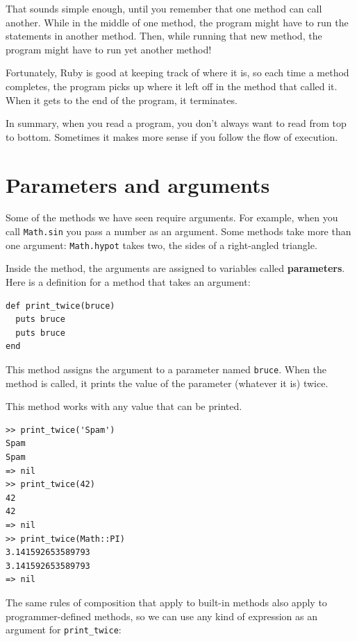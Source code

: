 \documentclass[10pt]{book}
\begin{document}
That sounds simple enough, until you remember that one method can
call another.  While in the middle of one method, the program might
have to run the statements in another method.  Then, while
running that new method, the program might have to run yet
another method!

Fortunately, Ruby is good at keeping track of where it is, so each
time a method completes, the program picks up where it left off in
the method that called it.  When it gets to the end of the program,
it terminates.

In summary, when you read a program, you
don't always want to read from top to bottom.  Sometimes it makes
more sense if you follow the flow of execution.


\section{Parameters and arguments}
\label{parameters}

Some of the methods we have seen require arguments.  For
example, when you call {\tt Math.sin} you pass a number
as an argument.  Some methods take more than one argument:
{\tt Math.hypot} takes two, the sides of a right-angled triangle.

Inside the method, the arguments are assigned to
variables called {\bf parameters}.  Here is a definition for
a method that takes an argument:

\begin{verbatim}
def print_twice(bruce)
  puts bruce
  puts bruce
end
\end{verbatim}
%
This method assigns the argument to a parameter
named {\tt bruce}.  When the method is called, it prints the value of
the parameter (whatever it is) twice.

This method works with any value that can be printed.

\begin{verbatim}
>> print_twice('Spam')
Spam
Spam
=> nil
>> print_twice(42)
42
42
=> nil
>> print_twice(Math::PI)
3.141592653589793
3.141592653589793
=> nil
\end{verbatim}
%
The same rules of composition that apply to built-in methods also
apply to programmer-defined methods, so we can use any kind of expression
as an argument for \verb"print_twice":
\end{document}
